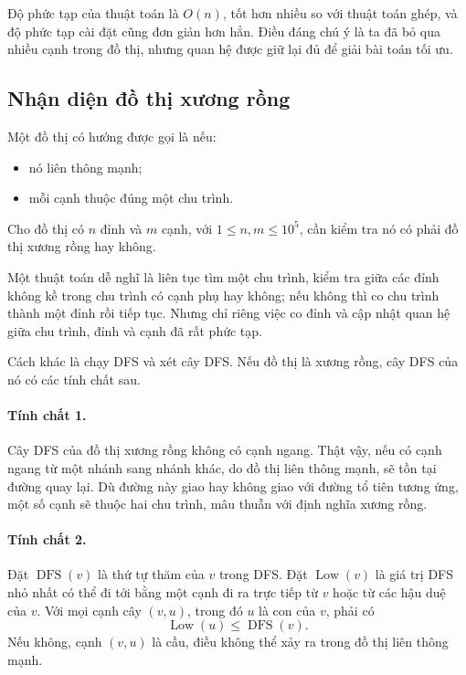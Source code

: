 \documentclass[11pt]{article}
\begin{document}
Độ phức tạp của thuật toán là \(O(n)\), tốt hơn nhiều so với thuật toán ghép,
và độ phức tạp cài đặt cũng đơn giản hơn hẳn. Điều đáng chú ý là ta đã bỏ qua
nhiều cạnh trong đồ thị, nhưng quan hệ được giữ lại đủ để giải bài toán tối
ưu.

\subsection{Nhận diện đồ thị xương rồng}

Một đồ thị có hướng được gọi là  nếu:
\begin{itemize}
  \item nó liên thông mạnh;
  \item mỗi cạnh thuộc đúng một chu trình.
\end{itemize}

Cho đồ thị có \(n\) đỉnh và \(m\) cạnh, với \(1\le n,m\le 10^5\), cần kiểm tra
nó có phải đồ thị xương rồng hay không.

Một thuật toán dễ nghĩ là liên tục tìm một chu trình, kiểm tra giữa các đỉnh
không kề trong chu trình có cạnh phụ hay không; nếu không thì co chu trình
thành một đỉnh rồi tiếp tục. Nhưng chỉ riêng việc co đỉnh và cập nhật quan hệ
giữa chu trình, đỉnh và cạnh đã rất phức tạp.

Cách khác là chạy DFS và xét cây DFS. Nếu đồ thị là xương rồng, cây DFS của
nó có các tính chất sau.

\paragraph{Tính chất 1.}
Cây DFS của đồ thị xương rồng không có cạnh ngang. Thật vậy, nếu có cạnh
ngang từ một nhánh sang nhánh khác, do đồ thị liên thông mạnh, sẽ tồn tại
đường quay lại. Dù đường này giao hay không giao với đường tổ tiên tương ứng,
một số cạnh sẽ thuộc hai chu trình, mâu thuẫn với định nghĩa xương rồng.

\paragraph{Tính chất 2.}
Đặt \(\operatorname{DFS}(v)\) là thứ tự thăm của \(v\) trong DFS. Đặt
\(\operatorname{Low}(v)\) là giá trị DFS nhỏ nhất có thể đi tới bằng một cạnh
đi ra trực tiếp từ \(v\) hoặc từ các hậu duệ của \(v\). Với mọi cạnh cây
\((v,u)\), trong đó \(u\) là con của \(v\), phải có
\[
  \operatorname{Low}(u)\le \operatorname{DFS}(v).
\]
Nếu không, cạnh \((v,u)\) là cầu, điều không thể xảy ra trong đồ thị liên
thông mạnh.
\end{document}
